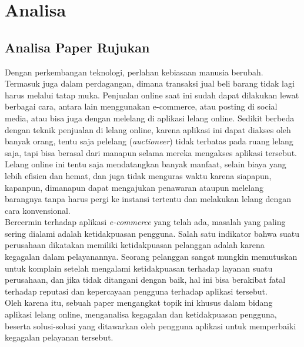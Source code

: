 \section{Analisa}
  
    \subsection{Analisa Paper Rujukan}
	    \label{analisa-paper-rujukan}
	    Dengan perkembangan teknologi, perlahan kebiasaan manusia berubah. Termasuk juga dalam perdagangan, dimana transaksi jual beli barang tidak lagi harus melalui tatap muka. Penjualan online saat ini sudah dapat dilakukan lewat berbagai cara, antara lain menggunakan e-commerce, atau posting di social media, atau bisa juga dengan melelang di aplikasi lelang online. Sedikit berbeda dengan teknik penjualan di lelang online, karena aplikasi ini dapat diakses oleh banyak orang, tentu saja pelelang (\textit{auctioneer}) tidak terbatas pada ruang lelang saja, tapi bisa berasal dari manapun selama mereka mengakses aplikasi tersebut.  Lelang online ini tentu saja mendatangkan banyak manfaat, selain biaya yang lebih efisien dan hemat, dan juga tidak menguras waktu karena siapapun, kapanpun, dimanapun dapat mengajukan penawaran ataupun melelang barangnya tanpa harus pergi ke instansi tertentu dan melakukan lelang dengan cara konvensional.\\
		\indent Bercermin terhadap aplikasi \textit{e-commerce} yang telah ada, masalah yang paling sering dialami adalah ketidakpuasan pengguna. Salah satu indikator bahwa suatu perusahaan dikatakan memiliki ketidakpuasan pelanggan adalah karena kegagalan dalam pelayanannya. Seorang pelanggan sangat mungkin memutuskan untuk komplain setelah mengalami ketidakpuasan terhadap layanan suatu perusahaan, dan jika tidak ditangani dengan baik, hal ini bisa berakibat fatal terhadap reputasi dan kepercayaan pengguna terhadap aplikasi tersebut. \\
		\indent Oleh karena itu, sebuah paper mengangkat topik ini khusus dalam bidang aplikasi lelang online, menganalisa kegagalan dan ketidakpuasan pengguna, beserta solusi-solusi yang ditawarkan oleh pengguna aplikasi untuk memperbaiki kegagalan pelayanan tersebut. 
		
